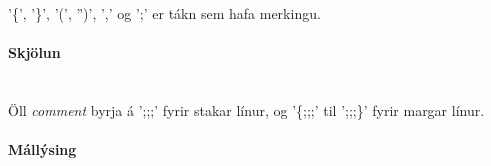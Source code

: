 \documentclass{article}
\begin{document}
'\{', '\}', '(', '')', ',' og ';' er tákn sem hafa merkingu.

\paragraph{Skjölun} ~\\

Öll \emph{comment} byrja á ';;;' fyrir stakar línur, og '\{;;;' til ';;;\}' fyrir margar línur.

\clearpage
\paragraph{{\Large Mállýsing}}

\setlength{\grammarparsep}{20pt plus 1pt minus 1pt} %
\setlength{\grammarindent}{12em} %
\end{document}
